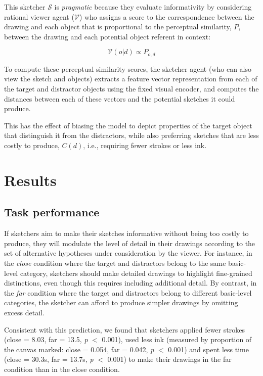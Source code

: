 \documentclass[9pt,twocolumn,twoside]{pnas-new}
\begin{document}
This sketcher $\mathcal{S}$ is \emph{pragmatic} because they evaluate informativity by considering rational viewer agent ($\mathcal{V}$) who assigns a score to the correspondence between the drawing and each object that is proportional to the perceptual similarity, $P$, between the drawing and each potential object referent in context:

\begin{equation} \label{literal_viewer_score}
\mathcal{V}(o|d) \propto P_{o,d}
\end{equation}

To compute these perceptual similarity scores, the sketcher agent (who can also view the sketch and objects) extracts a feature vector representation from each of the target and distractor objects using the fixed visual encoder, and computes the distances between each of these vectors and the potential sketches it could produce. 

This has the effect of biasing the model to depict properties of the target object that distinguish it from the distractors, while also preferring sketches that are less costly to produce, $C(d)$, i.e., requiring fewer strokes or less ink.


\section*{Results}

\subsection*{Task performance}

If sketchers aim to make their sketches informative without being too costly to produce, they will modulate the level of detail in their drawings according to the set of alternative hypotheses under consideration by the viewer. For instance, in the \textit{close} condition where the target and distractors belong to the same basic-level category, sketchers should make detailed drawings to highlight fine-grained distinctions, even though this requires including additional detail. By contrast, in the \textit{far} condition where the target and distractors belong to different basic-level categories, the sketcher can afford to produce simpler drawings by omitting excess detail.

Consistent with this prediction, we found that sketchers applied fewer strokes (close = 8.03, far = 13.5, \textit{p} $<$ 0.001), used less ink (measured by proportion of the canvas marked: close = 0.054, far = 0.042, \textit{p} $<$ 0.001) and spent less time (close = 30.3s, far = 13.7s, \textit{p} $<$ 0.001) to make their drawings in the far condition than in the close condition. 
\end{document}

